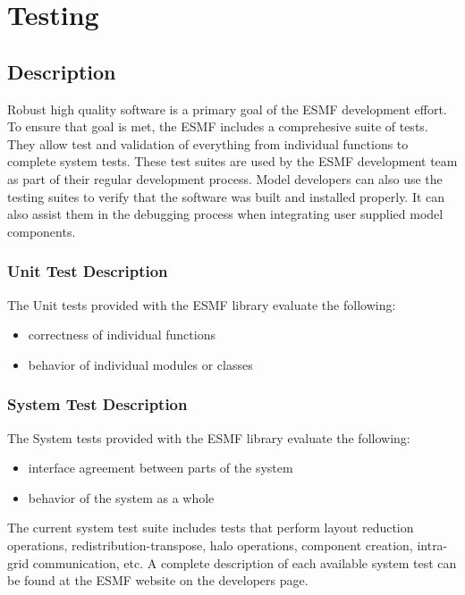 
\section{Testing}
\label{testing}

\subsection{Description}
\label{TestDescription}
Robust high quality software is a primary goal of the ESMF development effort. To ensure that goal is met, the ESMF includes a comprehesive suite of tests. They allow test and validation of everything from individual functions to complete system tests. These test suites are used by the ESMF development team as part of their regular development process. Model developers can also use the testing suites to verify that the software was built and installed properly. It can also assist them in the debugging process when integrating user supplied model components. 

\subsubsection{Unit Test Description}
\label{UnitTestDescription}
The Unit tests provided with the ESMF library evaluate the following:
\begin{itemize}
\item correctness of individual functions
\item behavior of individual modules or classes
\end{itemize}

\subsubsection{System Test Description}
\label{SystemTestDescription}

The System tests provided with the ESMF library evaluate the following:
\begin{itemize}
\item interface agreement between parts of the system
\item behavior of the system as a whole
\end{itemize}

The current system test suite includes tests that perform layout reduction operations, redistribution-transpose, halo operations, component creation, intra-grid communication, etc. A complete description of each available system test can be found at the ESMF website on the developers page. 

